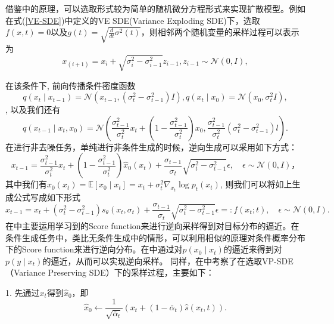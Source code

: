 借鉴\cite{DDPM}中的原理，可以选取形式较为简单的随机微分方程形式来实现扩散模型。例如在式(\ref{VE-SDE})中定义的VE SDE(Variance Exploding SDE)下，选取$f(x,t)=0$以及$g(t) = \sqrt{\frac{d}{dt}\sigma^2(t)}$，则相邻两个随机变量的采样过程可以表示为
\begin{equation}
    x_{(i+1)} = x_{i}+\sqrt{\sigma_i^2-\sigma_{i-1}^2}z_{i-1}, z_{i-1}\sim \mathcal{N}(0,I),
\end{equation}


在该条件下, 前向传播条件密度函数 
\begin{equation}
  q\left(x_t \mid x_{t-1}\right)=\mathcal{N}\left(x_{t-1},\left(\sigma_t^2-\sigma_{t-1}^2\right) I\right), q\left(x_t \mid x_0\right)=\mathcal{N}\left(x_0, \sigma_t^2 I\right),  
\end{equation}
, 以及我们还有
\begin{equation}
    q\left(x_{t-1} \mid x_t, x_0\right)=\mathcal{N}\left(\frac{\sigma_{t-1}^2}{\sigma_t^2} x_t+\left(1-\frac{\sigma_{t-1}^2}{\sigma_t^2}\right) x_0, \frac{\sigma_{t-1}^2}{\sigma_t^2}\left(\sigma_t^2-\sigma_{t-1}^2\right) l\right) .
\end{equation}
在进行非去噪任务，单纯进行非条件生成的时候，逆向生成可以采用如下方式：
\begin{equation}
    x_{t-1}=\frac{\sigma_{t-1}^2}{\sigma_t^2} x_t+\left(1-\frac{\sigma_{t-1}^2}{\sigma_t^2}\right) \hat{x}_0\left(x_t\right)+\frac{\sigma_{t-1}}{\sigma_t} \sqrt{\sigma_t^2-\sigma_{t-1}^2} \epsilon, \quad \epsilon \sim \mathcal{N}(0, I) ，
\end{equation}
其中我们有$\hat{x}_0\left(x_t\right)=\mathbb{E}\left[x_0 \mid x_t\right]=x_t+\sigma_t^2 \nabla_{x_t} \log p_t\left(x_t\right)$, 则我们可以将如上生成公式写成如下形式
\begin{equation}
    x_{t-1}=x_t+\left(\sigma_t^2-\sigma_{t-1}^2\right) s_\theta\left(x_t, \sigma_t\right)+\frac{\sigma_{t-1}}{\sigma_t} \sqrt{\sigma_t^2-\sigma_{t-1}^2} \epsilon=: f\left(x_t ; t\right), \quad \epsilon \sim \mathcal{N}(0, I).
    \label{reverse sampling}
\end{equation}
在\cite{song_2,DDPM}中主要运用学习到的Score function来进行逆向采样得到对目标分布的逼近。在条件生成任务中，类比无条件生成中的情形，可以利用相似的原理对条件概率分布下的Score function来进行逆向分布。在\cite{Inverse}中通过对$p(x_0\mid x_t)$的逼近来得到对$p(y\mid x_t)$的逼近，从而可以实现逆向采样。
同样，在\cite{Inverse}中考察了在选取VP-SDE（Variance Preserving SDE）下的采样过程，主要如下：      

1. 先通过$x_t$得到$\hat{x}_0$，即
\begin{equation}
    \hat{{x}}_0 \leftarrow \frac{1}{\sqrt{\bar{\alpha}_t}}\left({x}_t+\left(1-\bar{\alpha}_t\right) \hat{{s}}(x_t,t)\right).
\end{equation}
        

